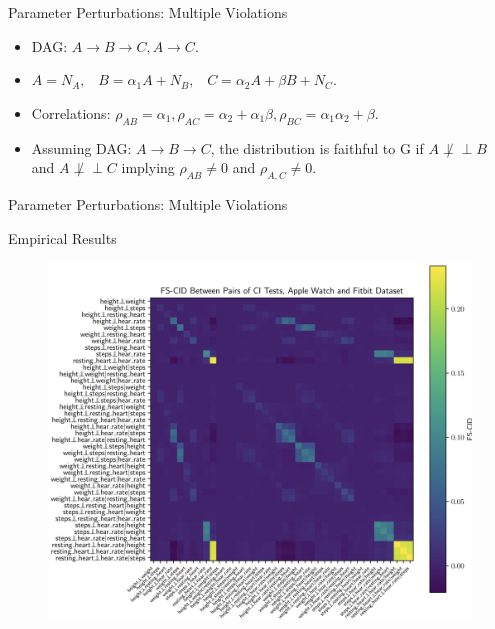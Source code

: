 \documentclass{beamer}
\def\ci{\perp\!\!\!\!\!\perp}
\begin{document}
\begin{frame}{Parameter Perturbations: Multiple Violations}
	\begin{itemize}
		\item DAG: $ A \rightarrow B \rightarrow C, A \rightarrow C $.
		\item $ A = N_A, \;\;\; B = \alpha_1 A + N_B, \;\;\; C = \alpha_2 A + \beta B + N_C $.
		\item Correlations: $ \rho_{AB} = \alpha_1, \rho_{AC} = \alpha_2 + \alpha_1 \beta , \rho_{BC} = \alpha_1 \alpha_2 + \beta$.
		\item  Assuming DAG: $ A \rightarrow B \rightarrow C $, the distribution is faithful to G if $ A \not \ci B $ and $ A \not \ci C $ implying $ \rho_{AB} \ne 0 $ and $ \rho_{A,C} \ne 0 $.
	\end{itemize}	
\end{frame}

\begin{frame}{Parameter Perturbations: Multiple Violations}

\end{frame}


\begin{frame}{Empirical Results}
	\begin{figure}
		\includegraphics[scale=0.12]{imgs/empirical1.png}
	\end{figure}
\end{frame}
\end{document}
